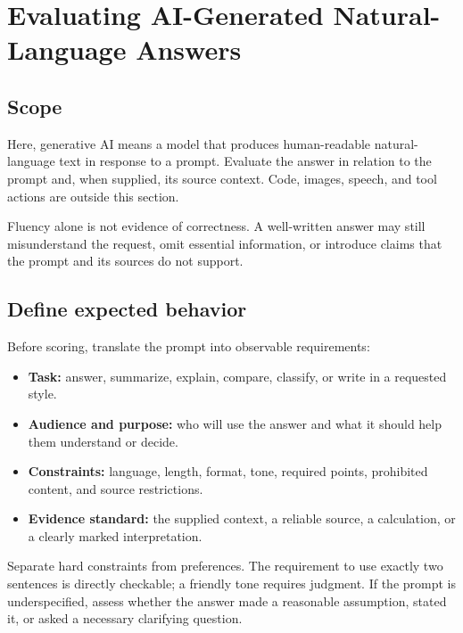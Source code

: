 \documentclass[a4paper]{article}
\title{}
\date{}
\author{Mohammad Rahmani}
\begin{document}
   \maketitle

   \section{Evaluating AI-Generated Natural-Language Answers}
   \label{sec:natural-language-answer-evaluation}

   \subsection{Scope}
   Here, generative AI means a model that produces human-readable natural-language
   text in response to a prompt. Evaluate the answer in relation to the prompt
   and, when supplied, its source context. Code, images, speech, and tool actions
   are outside this section.

   Fluency alone is not evidence of correctness. A well-written answer may still
   misunderstand the request, omit essential information, or introduce claims
   that the prompt and its sources do not support.

   \subsection{Define expected behavior}
   Before scoring, translate the prompt into observable requirements:
   \begin{itemize}
      \item \textbf{Task:} answer, summarize, explain, compare, classify, or write
      in a requested style.
      \item \textbf{Audience and purpose:} who will use the answer and what it
      should help them understand or decide.
      \item \textbf{Constraints:} language, length, format, tone, required
      points, prohibited content, and source restrictions.
      \item \textbf{Evidence standard:} the supplied context, a reliable source,
      a calculation, or a clearly marked interpretation.
   \end{itemize}
   Separate hard constraints from preferences. The requirement to use exactly
   two sentences is directly checkable; a friendly tone requires judgment. If
   the prompt is underspecified, assess whether the answer made a reasonable
   assumption, stated it, or asked a necessary clarifying question.
\end{document}
